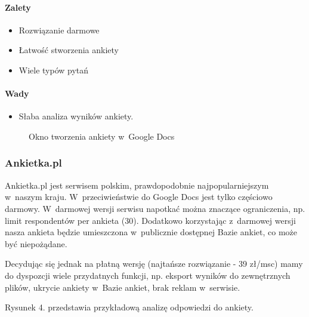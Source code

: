 \documentclass[12pt,a4paper,notitlepage]{article}
\begin{document}
\paragraph{Zalety}
\begin{itemize}
\item Rozwiązanie darmowe
\item Łatwość stworzenia ankiety
\item Wiele typów pytań
\end{itemize}

\paragraph{Wady}
\begin{itemize}
\item Słaba analiza wyników ankiety.
\end{itemize}

\begin{figure}[H]
\begin{center}
\caption{Okno tworzenia ankiety w~Google Docs}
\end{center}
\end{figure}

\subsubsection{Ankietka.pl}
Ankietka.pl jest serwisem polskim, prawdopodobnie najpopularniejszym w~naszym kraju. W~przeciwieństwie do Google Docs jest tylko częściowo darmowy. W~darmowej wersji serwisu napotkać można znaczące ograniczenia, np. limit respondentów per ankieta (30). Dodatkowo korzystając z~darmowej wersji nasza ankieta będzie umieszczona w~publicznie dostępnej Bazie ankiet, co może być niepożądane.
\par Decydując się jednak na płatną wersję (najtańsze rozwiązanie - 39 zł/msc) mamy do dyspozcji wiele przydatnych funkcji, np. eksport wyników do zewnętrznych plików, ukrycie ankiety w~Bazie ankiet, brak reklam w~serwisie.
\par Rysunek 4. przedstawia przykładową analizę odpowiedzi do ankiety.
\end{document}
